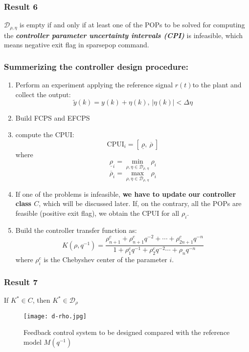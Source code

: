 \subsubsection{Result 6}
$\mathcal{D}_{\rho,\eta}$ is empty if and only if at least one of the POPs to be solved for computing the \textbf{\textit{controller parameter uncertainty intervals (CPI)}} is infeasible, which means negative exit flag in sparsepop command.
 

\subsubsection{Summerizing the controller design procedure:}
\begin{enumerate}
    \item Perform an experiment applying the reference signal $r(t)$to the plant and collect the output:
    \[
    \tilde{y}(k) = y(k) + \eta(k),\,|\eta(k)| < \Delta\eta
    \]
    
    \item Build FCPS and EFCPS
    \item compute the CPUI:
    \[
    \text{CPUI}_i = [\:\underline{\rho},\:\overline{\rho}\:]
    \]
    where
    \[
    \underline{\rho}_i = \min\limits_{\rho,\eta \in \mathcal{D}_{\rho,\,\eta}} \rho_i
    \]
    \[
    \overline{\rho}_i = \max\limits_{\rho,\eta \in \mathcal{D}_{\rho,\,\eta}} \rho_i
    \]
    \item If one of the problems is infeasible, \textbf{we have to update our controller class $C$}, which will be discussed later.
    If, on the contrary, all the POPs are feasible (positive exit flag), we obtain the CPUI for all $\rho_i$.
    \item Build the controller transfer function as:
    \[
    K(\rho,q^{-1}) = \frac{\rho_{n+1}^c + \rho_{n+1}^cq^{-2} + \cdots + \rho_{2n+1}^cq^{-n}}{1+ \rho_1^cq^{-1} + \rho_2^cq^{-2} \cdots + \rho_{n}q^{-n}}
    \]
    where $\rho_i^c$ is the Chebyshev center of the parameter $i$.
\end{enumerate}

\subsubsection{Result 7}
If $K^{*} \in C$, then $K^{*} \in \mathcal{D}_\rho$
 \begin{figure}[H]
    \centering
    \texttt{[image: d-rho.jpg]}
    \caption{Feedback control system to be designed compared with the
 reference model $M(q^{-1})$}
 \end{figure}


